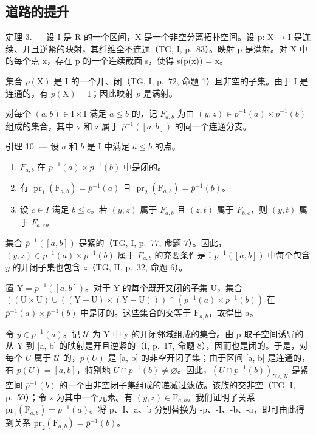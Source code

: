 \subsection{道路的提升}

定理 3. --- 设 I 是 R 的一个区间，X 是一个非空分离拓扑空间。设 p: X → I 是连续、开且逆紧的映射，其纤维全不连通（TG, I, p.~83）。映射 p 是满射。对 X 中的每个点 x，存在 p 的一个连续截面 s，使得 s(p(x)) = x。

集合 \(p(\mathrm{X})\) 是 I 的一个开、闭（TG, I, p.~72, 命题 1）且非空的子集。由于 I 是连通的，有 \(p(\mathrm{X}) = \mathrm{I}\)；因此映射 \(p\) 是满射。

对每个 \((a,b)\in\mathrm{I}\times\mathrm{I}\) 满足 \(a\leqslant b\) 的，记 \(F_{a,b}\) 为由 \((y,z)\in\overline{p}^{-1}(a)\times\overline{p}^{-1}(b)\) 组成的集合，其中 y 和 z 属于 \(\overline{p}^{-1}([a,b])\) 的同一个连通分支。

引理 10. --- 设 \(a\) 和 \(b\) 是 I 中满足 \(a \leqslant b\) 的点。

\begin{enumerate}
\def\labelenumi{\alph{enumi})}
\item
  \(F_{a,b}\) 在 \(\overline{p}^{-1}(a)\times\overline{p}^{-1}(b)\) 中是闭的。
\item
  有 \(\operatorname{pr}_1(\mathrm{F}_{a,b}) = \overline{p}^{-1}(a)\) 且 \(\operatorname{pr}_2(\mathrm{F}_{a,b}) = \overline{p}^{-1}(b)\)。
\item
  设 \(c \in I\) 满足 \(b \leqslant c\)。若 \((y,z)\) 属于 \(F_{a,b}\) 且 \((z,t)\) 属于 \(F_{b,c}\)，则 \((y,t)\) 属于 \(F_{a,c}\)。
\end{enumerate}

集合 \(\overline{p}^{-1}([a,b])\) 是紧的（TG, I, p.~77, 命题 7）。因此，\((y,z)\in\overline{p}^{-1}(a)\times\overline{p}^{-1}(b)\) 属于 \(F_{a,b}\) 的充要条件是：\(\overline{p}^{-1}([a,b])\) 中每个包含 \(y\) 的开闭子集也包含 \(z\)（TG, II, p.~32, 命题 6）。

置 \(\mathrm{Y} = \overline{p}^{-1}([a,b])\)。对于 Y 的每个既开又闭的子集 U，集合 \(((\mathrm{U} \times \mathrm{U}) \cup ((\mathrm{Y} - \mathrm{U}) \times (\mathrm{Y} - \mathrm{U}))) \cap (\overline{p}^{-1}(a) \times \overline{p}^{-1}(b))\) 在 \(\overline{p}^{-1}(a) \times \overline{p}^{-1}(b)\) 中是闭的。这些集合的交等于 \(\mathrm{F}_{a,b}\)，故得出 \(a\)。

令 \(y \in \overline{p}^{-1}(a)\)。记 \(\mathcal{U}\) 为 Y 中 y 的开闭邻域组成的集合。由 p 取子空间诱导的从 Y 到 {[}a, b{]} 的映射是开且逆紧的（I, p.~17, 命题 8），因而也是闭的。于是，对每个 \(U\) 属于 \(\mathcal{U}\) 的，\(p(U)\) 是 {[}a, b{]} 的非空开闭子集；由于区间 {[}a, b{]} 是连通的，有 \(p(U) = [a, b]\)，特别地 \(U \cap \overline{p}^{-1}(b) \neq \varnothing\)。因此，\((U \cap \overline{p}^{-1}(b))_{U \in \mathcal{U}}\) 是紧空间 \(\overline{p}^{-1}(b)\) 的一个由非空闭子集组成的递减过滤族。该族的交非空（TG, I, p.~59）；令 z 为其中一个元素。有 \((y, z) \in \mathrm{F}_{a,b}\)。我们证明了关系 \(\mathrm{pr}_{1}(\mathrm{F}_{a,b}) = \overline{p}^{-1}(a)\)。将 p、I、a、b 分别替换为 -p、-I、-b、-a，即可由此得到关系 \(\mathrm{pr}_{2}(\mathrm{F}_{a,b}) = \overline{p}^{-1}(b)\)。

